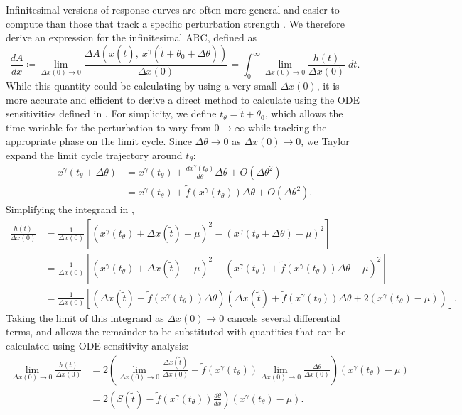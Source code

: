 Infinitesimal versions of response curves are often more general and easier to compute than those that track a specific perturbation strength \cite{Rand2004}.
We therefore derive an expression for the infinitesimal ARC, defined as
\begin{equation}
  \frac{dA}{dx} \coloneqq \lim_{\Delta x(0) \to 0} \frac{\Delta A\left(x(\tilde{t}),\ x^\gamma(\tilde{t} + \theta_0 + \Delta\theta)\right)}{\Delta x(0)} = \int_0^\infty \lim_{\Delta x(0) \to 0} \frac{h(t)}{\Delta x(0)} \; dt.
  \label{eq:sARC}
\end{equation}
While this quantity could be calculating by using a very small $\Delta x(0)$, it is more accurate and efficient to derive a direct method to calculate  using the ODE sensitivities defined in .
For simplicity, we define $t_\theta = \tilde{t} + \theta_0$, which allows the time variable for the perturbation to vary from $0 \to \infty$ while tracking the appropriate phase on the limit cycle.
Since $\Delta \theta \to 0$ as $\Delta x(0) \to 0$, we Taylor expand the limit cycle trajectory around $t_\theta$:
\begin{align}
  x^\gamma(t_\theta + \Delta\theta) &= x^\gamma(t_\theta) +
  \frac{dx^\gamma(t_\theta)}{d\theta}\Delta\theta + O(\Delta\theta^2)\\
  &= x^\gamma(t_\theta) + \tilde{f}\left(x^\gamma(t_\theta)\right)\Delta\theta +
  O(\Delta\theta^2).
\end{align}
Simplifying the integrand in ,
\begin{align}
  \frac{h(t)}{\Delta x(0)} &= \frac{1}{\Delta x(0)} \left[\left(x^\gamma(t_\theta) + \Delta x(\tilde{t}) - \mu\right)^2 - \left(x^\gamma(t_\theta + \Delta \theta) - \mu\right)^2 \right]\\
  &= \frac{1}{\Delta x(0)} \left[\left(x^\gamma(t_\theta) + \Delta x(\tilde{t}) - \mu\right)^2 - \left(x^\gamma(t_\theta) + \tilde{f}\left(x^\gamma(t_\theta)\right)\Delta\theta - \mu\right)^2 \right]\\
  &= \frac{1}{\Delta x(0)} \left[\left(\Delta x(\tilde{t}) - \tilde{f}\left(x^\gamma(t_\theta)\right)\Delta\theta\right) \left(\Delta x(\tilde{t}) + \tilde{f}\left(x^\gamma(t_\theta)\right)\Delta\theta + 2(x^\gamma(t_\theta) - \mu)\right) \right].
\end{align}
Taking the limit of this integrand as $\Delta x(0) \to 0$ cancels several differential terms, and allows the remainder to be substituted with quantities that can be calculated using ODE sensitivity analysis:
\begin{align}
  \lim_{\Delta x(0) \to 0} \frac{h(t)}{\Delta x(0)} &= 2\left(\lim_{\Delta x(0) \to 0}\frac{\Delta x(\tilde{t})}{\Delta x(0)} - \tilde{f}\left(x^\gamma(t_\theta)\right)\lim_{\Delta x(0) \to 0}\frac{\Delta\theta}{\Delta x(0)}\right) \left(x^\gamma(t_\theta) - \mu\right)\\
  &= 2\left(S(\tilde{t}) - \tilde{f}(x^\gamma(t_\theta))\frac{d\theta}{dx}\right)\left(x^\gamma(t_\theta) - \mu\right).
  \label{eq:sens_sub}
\end{align}
